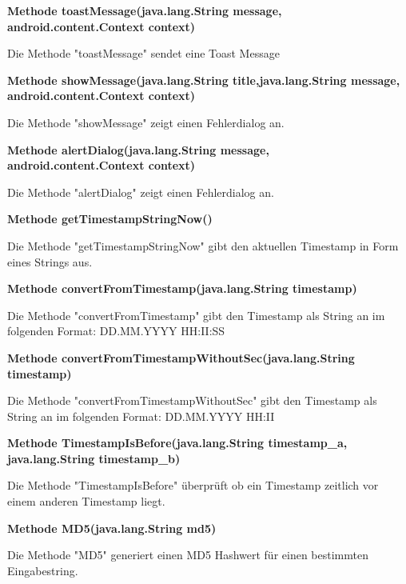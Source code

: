 \documentclass{scrartcl}
\begin{document}
\noindent\textbf{Methode toastMessage(java.lang.String message, \newline                   android.content.Context context)}

\noindent Die Methode "toastMessage" sendet eine Toast Message \newline

\noindent\textbf{Methode showMessage(java.lang.String title,\newline  java.lang.String message, android.content.Context context)}

\noindent Die Methode "showMessage" zeigt einen Fehlerdialog an. \newline

\noindent\textbf{Methode alertDialog(java.lang.String message, \newline  android.content.Context context)}

\noindent Die Methode "alertDialog" zeigt einen Fehlerdialog an. \newline

\noindent\textbf{Methode getTimestampStringNow()}

\noindent Die Methode "getTimestampStringNow" gibt den aktuellen Timestamp in Form eines Strings aus. \newline 

\noindent\textbf{Methode convertFromTimestamp(java.lang.String timestamp)}

\noindent Die Methode "convertFromTimestamp" gibt den Timestamp als String an im folgenden Format: DD.MM.YYYY HH:II:SS \newline 

\noindent\textbf{Methode convertFromTimestampWithoutSec(java.lang.String timestamp)}

\noindent Die Methode "convertFromTimestampWithoutSec" gibt den Timestamp als String an im folgenden Format: DD.MM.YYYY HH:II \newline 

\noindent\textbf{Methode TimestampIsBefore(java.lang.String timestamp\_a, \newline          java.lang.String timestamp\_b)}

\noindent Die Methode "TimestampIsBefore" überprüft ob ein Timestamp zeitlich vor einem anderen Timestamp liegt. \newline

\noindent\textbf{Methode MD5(java.lang.String md5)}

\noindent Die Methode "MD5" generiert einen MD5 Hashwert für einen bestimmten Eingabestring. \newline
\end{document}
